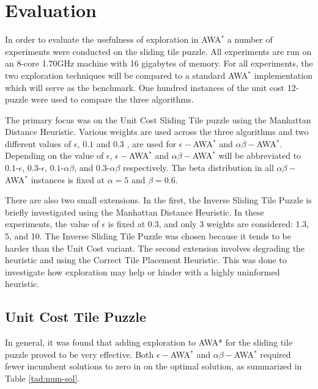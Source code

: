 \section{Evaluation}
In order to evaluate the usefulness of exploration in AWA$^*$ a number of experiments were conducted on the sliding tile puzzle. All experiments are run on an 8-core 1.70GHz machine with 16 gigabytes of memory. For all experiments, the two exploration techniques will be compared to a standard AWA$^*$ implementation which will serve as the benchmark. One hundred instances of the unit cost 12-puzzle were used to compare the three algorithms.

The primary focus was on the Unit Cost Sliding Tile puzzle using the Manhattan Distance Heuristic. Various weights are used across the three algorithms and two different values of $\epsilon$, $0.1$ and $0.3$ \cite{valenzano2014comparison}, are used for $\epsilon-$AWA$^*$ and $\alpha \beta-$AWA$^*$. Depending on the value of $\epsilon$, $\epsilon-$AWA$^*$ and $\alpha \beta-$AWA$^*$ will be abbreviated to $0.1$-$\epsilon$, $0.3$-$\epsilon$, $0.1$-$\alpha \beta$, and $0.3$-$\alpha \beta$ respectively. The beta distribution in all $\alpha \beta-$AWA$^*$ instances is fixed at $\alpha=5$ and $\beta=0.6$.

There are also two small extensions. In the first, the Inverse Sliding Tile Puzzle is briefly investigated using the Manhattan Distance Heuristic. In these experiments, the value of $\epsilon$ is fixed at 0.3, and only 3 weights are considered: 1.3, 5, and 10. The Inverse Sliding Tile Puzzle was chosen because it tends to be harder than the Unit Cost variant. The second extension involves degrading the heuristic and using the Correct Tile Placement Heuristic. This was done to investigate how exploration may help or hinder with a highly uninformed heuristic.

\subsection{Unit Cost Tile Puzzle}
In general, it was found that adding exploration to AWA* for the sliding tile puzzle proved to be very effective. Both $\epsilon-$AWA$^*$ and $\alpha \beta-$AWA$^*$ required fewer incumbent solutions to zero in on the optimal solution, as summarized in Table \ref{tad:num-sol}.

